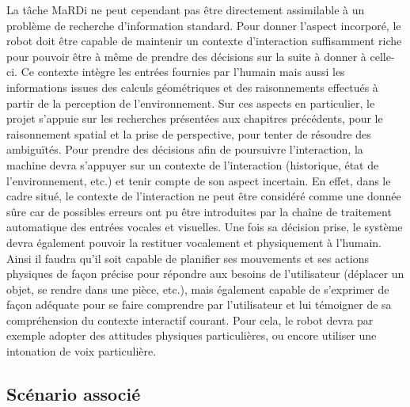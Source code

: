 \documentclass[a4paper,11pt,twoside]{StyleThese}
\begin{document}
La tâche MaRDi ne peut cependant pas être directement
assimilable à un problème de recherche d’information standard.
Pour donner l'aspect incorporé, le robot doit être capable de maintenir un contexte d’interaction suffisamment riche pour pouvoir être à même de prendre des décisions sur la suite à donner à celle-ci. Ce contexte intègre les entrées fournies par l’humain mais aussi les informations issues des calculs géométriques et des raisonnements effectués à partir de la perception de l’environnement. Sur ces aspects en particulier,
le projet s'appuie sur les recherches présentées aux chapitres précédents, pour le raisonnement
spatial et la prise de perspective, pour tenter de résoudre des ambiguïtés.
Pour prendre des décisions afin de poursuivre l’interaction, la machine devra s’appuyer sur un contexte de l’interaction (historique, état de l’environnement, etc.) et tenir
compte de son aspect incertain. En effet, dans le cadre situé, le contexte de l’interaction ne peut être considéré comme une donnée sûre car de possibles erreurs ont pu être
introduites par la chaîne de traitement automatique des entrées vocales et visuelles.
Une fois sa décision prise, le système devra également pouvoir la restituer vocalement et physiquement à l’humain. Ainsi il faudra qu’il soit capable de planifier ses
mouvements et ses actions physiques de façon précise pour répondre aux besoins de
l’utilisateur (déplacer un objet, se rendre dans une pièce, etc.), mais également capable
de s’exprimer de façon adéquate pour se faire comprendre par l’utilisateur et lui témoigner de sa compréhension du contexte interactif courant. Pour cela, le robot devra par
exemple adopter des attitudes physiques particulières, ou encore utiliser une intonation de
voix particulière.


\subsection{Scénario associé}
\end{document}
